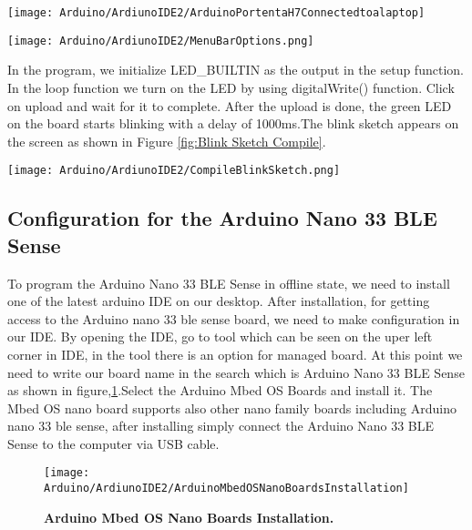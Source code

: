 \begin{center}
    \label{fig:Arduino PortentaH7 Connected to a Laptop}
    \texttt{[image: Arduino/ArdiunoIDE2/ArduinoPortentaH7Connectedtoalaptop]}
\end{center}

\begin{center}
    \label{fig:Example LED-Test}
    \texttt{[image: Arduino/ArdiunoIDE2/MenuBarOptions.png]}
\end{center}


In the program, we initialize LED\_BUILTIN as the output in the setup function. In the loop function we turn on the LED by using digitalWrite() function. Click on upload and wait for it to complete. After the upload is done, the green LED on the board starts blinking with a delay of 1000ms.The blink sketch appears on the screen as shown in Figure \ref{fig:Blink Sketch Compile}.

\begin{center}
    \label{fig:Blink Sketch Compile}
    \texttt{[image: Arduino/ArdiunoIDE2/CompileBlinkSketch.png]}
\end{center}


\subsection{Configuration for the Arduino Nano 33 BLE Sense}

To program the Arduino Nano 33 BLE Sense in offline state, we need to install one
of the latest arduino IDE on our desktop. After installation, for getting access to
the Arduino nano 33 ble sense board, we need to make configuration in our IDE. By
opening the IDE, go to tool which can be seen on the uper left corner in IDE, in the
tool there is an option for managed board. At this point we need to write our board
name in the search which is Arduino Nano 33 BLE Sense as shown in figure,\ref{fig:Arduino Mbed OS Nano Boards Installation}.Select
the Arduino Mbed OS Boards and install it. The Mbed OS nano board supports also
other nano family boards including Arduino nano 33 ble sense, after installing simply
connect the Arduino Nano 33 BLE Sense to the computer via USB cable.


\begin{figure}[H]\centering
    \texttt{[image: Arduino/ArdiunoIDE2/ArduinoMbedOSNanoBoardsInstallation]}
    \caption{\textbf{Arduino Mbed OS Nano Boards Installation.}}
    \label{fig:Arduino Mbed OS Nano Boards Installation}		
\end{figure}



